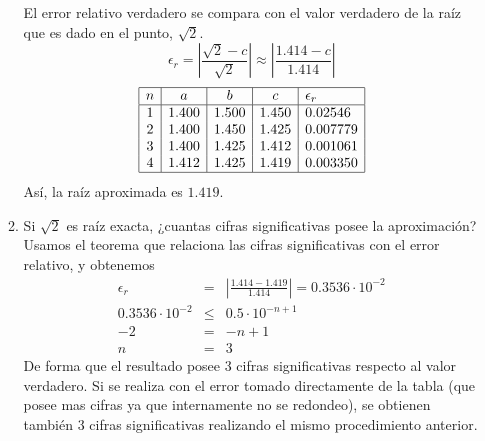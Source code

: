 \documentclass[12pt]{article}
\begin{document}
\begin{enumerate}[leftmargin=*,widest=9]
\begin{enumerate}[label=\alph*]
    El error relativo verdadero se compara con el valor verdadero de la raíz que es dado en el punto, $\sqrt{2}$.
    \[ \epsilon_r = \left| \frac{\sqrt{2} - c}{\sqrt{2}} \right| \approx \left|\frac{1.414 - c}{1.414} \right| \]
    \[
    \begin{array}{|c|c|c|c|l|}
    \hline
    n & a & b & c & \epsilon_r \\
    \hline
 1 & 1.400 & 1.500 & 1.450 & 0.02546\\
 2 & 1.400 & 1.450 & 1.425 & 0.007779\\
 3 & 1.400 & 1.425 & 1.412 & 0.001061 \\
 4 & 1.412 & 1.425 & 1.419 & 0.003350 \\
    \hline
    \end{array}
    \]
    Así, la raíz aproximada es $1.419$.
    \item Si $\sqrt{2}$ es raíz exacta, ¿cuantas cifras significativas posee la aproximación?
    Usamos el teorema que relaciona las cifras significativas con el error relativo, y obtenemos
    \begin{eqnarray*}
    \epsilon_r  & = & \left| \frac{1.414 - 1.419}{1.414} \right| = 0.3536\cdot 10^{-2}  \\
    0.3536\cdot 10^{-2} & \leq & 0.5 \cdot 10^{-n + 1} \\
    -2 & = & -n + 1 \\
    n & = & 3
    \end{eqnarray*}
    De forma que el resultado posee 3 cifras significativas respecto al valor verdadero. Si se realiza con el error tomado directamente de la tabla (que posee mas cifras ya que internamente no se redondeo), se obtienen también 3 cifras significativas realizando el mismo procedimiento anterior.
    \end{enumerate}
  \end{enumerate}
\end{document}
